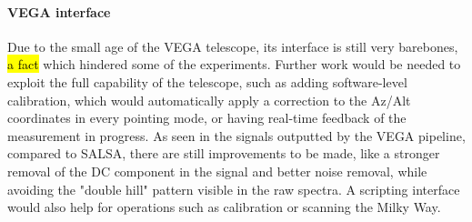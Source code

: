 \paragraph{VEGA interface}
Due to the small age of the VEGA telescope, its interface is still very barebones, \hl{a fact} which hindered some of the experiments. Further work would be needed to exploit the full capability of the telescope, such as adding software-level calibration, which would automatically apply a correction to the Az/Alt coordinates in every pointing mode, or having real-time feedback of the measurement in progress. As seen in the signals outputted by the VEGA pipeline, compared to SALSA, there are still improvements to be made, like a stronger removal of the DC component in the signal and better noise removal, while avoiding the "double hill" pattern visible in the raw spectra. A scripting interface would also help for operations such as calibration or scanning the Milky Way.
